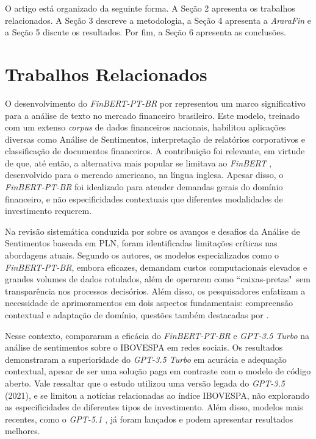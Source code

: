 \documentclass[12pt]{article}
\begin{document}
O artigo está organizado da seguinte forma. A Seção 2 apresenta os trabalhos relacionados. A Seção 3 descreve a metodologia, a Seção 4 apresenta a \textit{AraraFin} e a Seção 5 discute os resultados. Por fim, a Seção 6 apresenta as conclusões.

\section{Trabalhos Relacionados} \label{sec:firstpage}

O desenvolvimento do \textit{FinBERT-PT-BR} por \cite{santos2023finbert} representou um marco significativo para a análise de texto no mercado financeiro brasileiro. Este modelo, treinado com um extenso \textit{corpus} de dados financeiros nacionais, habilitou aplicações diversas como Análise de Sentimentos, interpretação de relatórios corporativos e classificação de documentos financeiros. A contribuição foi relevante, em virtude de que, até então, a alternativa mais popular se limitava ao \textit{FinBERT} \cite{yang2020finbert}, desenvolvido para o mercado americano, na língua inglesa. Apesar disso, o \textit{FinBERT-PT-BR} foi idealizado para atender demandas gerais do domínio financeiro, e não especificidades contextuais que diferentes modalidades de investimento requerem.

Na revisão sistemática conduzida por \cite{jim2024recent} sobre os avanços e desafios da Análise de Sentimentos baseada em PLN, foram identificadas limitações críticas nas abordagens atuais. Segundo os autores, os modelos especializados como o \textit{FinBERT-PT-BR}, embora eficazes, demandam custos computacionais elevados e grandes volumes de dados rotulados, além de operarem como ``caixas-pretas"\,   
sem transparência nos processos decisórios. Além disso, os pesquisadores enfatizam a necessidade de aprimoramentos em dois aspectos fundamentais: compreensão contextual e adaptação de domínio, questões também destacadas por \cite{mahendran2025comparative}.

Nesse contexto, \cite{beltramini2024analise} compararam a eficácia do \textit{FinBERT-PT-BR} e \textit{GPT-3.5 Turbo} na análise de sentimentos sobre o IBOVESPA em redes sociais. Os resultados demonstraram a superioridade do \textit{GPT-3.5 Turbo} em acurácia e adequação contextual, apesar de ser uma solução paga em contraste com o modelo de código aberto. Vale ressaltar que o estudo utilizou uma versão legada do \textit{GPT-3.5} (2021), e se limitou a notícias relacionadas ao índice IBOVESPA, não explorando as especificidades de diferentes tipos de investimento. Além disso, modelos mais recentes, como o \textit{GPT-5.1} \cite{openai-docs}, já foram lançados e podem apresentar resultados melhores.
\end{document}
